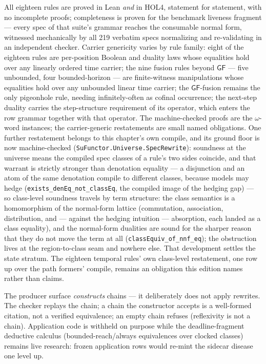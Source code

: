 All eighteen rules are proved in Lean \emph{and} in HOL4, statement
for statement, with no incomplete proofs; completeness is proven for
the benchmark liveness fragment --- every spec of that suite's
grammar reaches the consumable normal form, witnessed mechanically by
all 219 verbatim specs normalizing and re-validating in an
independent checker. Carrier genericity varies by rule family: eight of
the eighteen rules are per-position Boolean and duality laws whose
equalities hold over any linearly ordered time carrier; the nine
fusion rules beyond $\mathsf{GF}$ --- five unbounded, four
bounded-horizon --- are finite-witness manipulations whose equalities
hold over any unbounded linear time carrier; the
$\mathsf{GF}$-fusion remains the only pigeonhole rule, needing
infinitely-often as cofinal occurrence; the next-step duality carries
the step-structure requirement of its operator, which enters the row
grammar together with that operator. The machine-checked proofs are
the $\omega$-word instances; the carrier-generic restatements are
small named obligations. One further restatement belongs to this
chapter's own compile, and its ground floor is now machine-checked
(\texttt{SuFunctor.Universe.SpecRewrite}): soundness at the universe
means the compiled spec classes of a rule's two sides coincide, and
that warrant is strictly stronger than denotation equality --- a
disjunction and an atom of the same denotation compile to different
classes, because models may hedge
(\texttt{exists\_denEq\_not\_classEq}, the compiled image of the
hedging gap) --- so class-level soundness travels by term structure:
the class semantics is a homomorphism of the normal-form lattice
(commutation, association, distribution, and --- against the hedging
intuition --- absorption, each landed as a class equality), and the
normal-form dualities are sound for the sharper reason that they do
not move the term at all (\texttt{classEquiv\_of\_nnf\_eq}); the
obstruction lives at the region-to-class seam and nowhere else. That
development settles the state stratum. The eighteen temporal rules'
own class-level restatement, one row up over the path formers'
compile, remains an obligation this edition names rather than
claims.

The producer surface \emph{constructs} chains --- it deliberately
does not apply rewrites. The checker replays the chain; a chain the
constructor accepts is a well-formed citation, not a verified
equivalence; an empty chain refuses (reflexivity is not a chain).
Application code is withheld on purpose while the deadline-fragment
deductive calculus (bounded-reach/always equivalences over clocked
classes) remains live research: frozen application rows would re-mint
the sidecar disease one level up.

